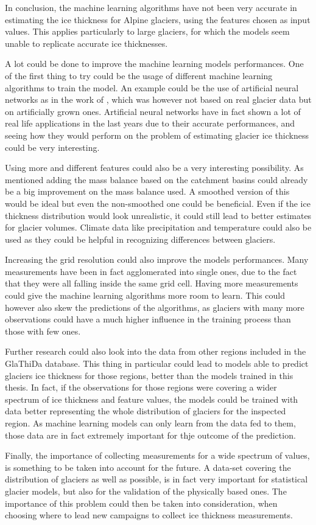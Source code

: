 In conclusion, the machine learning algorithms have not been very accurate in estimating the ice thickness for Alpine glaciers, using the features chosen as input values. This applies particularly to large glaciers, for which the models seem unable to replicate accurate ice thicknesses.

A lot could be done to improve the machine learning models performances. 
One of the first thing to try could be the usage of different machine learning algorithms to train the model. An example could be the use of artificial neural networks as in the work of \citet{Clarke2009}, which was however not based on real glacier data but on artificially grown ones. Artificial neural networks have in fact shown a lot of real life applications in the last years due to their accurate performances, and seeing how they would perform on the problem of estimating glacier ice thickness could be very interesting.
  
Using more and different features could also be a very interesting possibility. As mentioned adding the mass balance based on the catchment basins could already be a big improvement on the mass balance used. A smoothed version of this would be ideal but even the non-smoothed one could be beneficial. Even if the ice thickness distribution would look unrealistic, it could still lead to better estimates for glacier volumes. Climate data like precipitation and temperature could also be used as they could be helpful in recognizing differences between glaciers.

Increasing the grid resolution could also improve the models performances. Many measurements have been in fact agglomerated into single ones, due to the fact that they were all falling inside the same grid cell. Having more measurements could give the machine learning algorithms more room to learn. This could however also skew the predictions of the algorithms, as glaciers with many more observations could have a much higher influence in the training process than those with few ones. 
 
Further research could also look into the data from other regions included in the GlaThiDa database.  This thing in particular could lead to models able to predict glaciers ice thickness for those regions, better than the models trained in this thesis. In fact, if the observations for those regions were covering a wider spectrum of ice thickness and feature values, the models could be trained with data better representing the whole distribution of glaciers for the inspected region. As machine learning models can only learn from the data fed to them, those data are in fact extremely important for thje outcome of the prediction.
 
Finally, the importance of collecting measurements for a wide spectrum of values, is something to be taken into account for the future. A data-set covering the distribution of glaciers as well as possible, is in fact very important for statistical glacier models, but also for the validation of the physically based ones. The importance of this problem could then be taken into consideration, when choosing where to lead new campaigns to collect ice thickness measurements.
